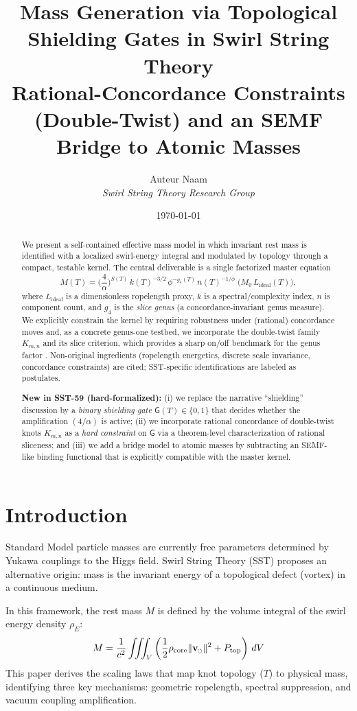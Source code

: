 \documentclass[11pt, a4paper]{article}
\title{\textbf{Mass Generation via Topological Shielding Gates in Swirl String Theory}\\
\large Rational-Concordance Constraints (Double-Twist) and an SEMF Bridge to Atomic Masses}
\author{Auteur Naam \\ \textit{Swirl String Theory Research Group}}
\date{\today}
\newcommand{\swirlarrow}{%
  \mathchoice{\mkern-2mu\scriptstyle\boldsymbol{\circlearrowleft}}%
             {\mkern-2mu\scriptstyle\boldsymbol{\circlearrowleft}}%
             {\mkern-2mu\scriptscriptstyle\boldsymbol{\circlearrowleft}}%
             {\mkern-2mu\scriptscriptstyle\boldsymbol{\circlearrowleft}}%
}
\newcommand{\vswirl}{\mathbf{v}_{\swirlarrow}}
\newcommand{\vnorm}{\lVert \vswirl \rVert}
\begin{document}
\maketitle

\begin{abstract}
We present a self-contained effective mass model in which invariant rest mass is identified with a localized swirl-energy integral and modulated by topology through a compact, testable kernel. The central deliverable is a single factorized master equation
\[
M(T)=\Big(\frac{4}{\alpha}\Big)^{S(T)}\,k(T)^{-3/2}\,\phi^{-g_4(T)}\,n(T)^{-1/\phi}\;\Big(M_0\,L_{\mathrm{ideal}}(T)\Big),
\]
where \(L_{\mathrm{ideal}}\) is a dimensionless ropelength proxy, \(k\) is a spectral/complexity index, \(n\) is component count, and \(g_4\) is the \emph{slice genus} (a concordance-invariant genus measure). We explicitly constrain the kernel by requiring robustness under (rational) concordance moves and, as a concrete genus-one testbed, we incorporate the double-twist family \(K_{m,n}\) and its slice criterion, which provides a sharp on/off benchmark for the genus factor \cite{Lee2025DoubleTwist}. Non-original ingredients (ropelength energetics, discrete scale invariance, concordance constraints) are cited; SST-specific identifications are labeled as postulates.
\par\smallskip
\textbf{New in SST-59 (hard-formalized):} (i) we replace the narrative ``shielding'' discussion by a \emph{binary shielding gate}
\(\mathsf{G}(T)\in\{0,1\}\) that decides whether the amplification \((4/\alpha)\) is active; (ii) we incorporate rational concordance of
double-twist knots \(K_{m,n}\) as a \emph{hard constraint} on \(\mathsf{G}\) via a theorem-level characterization of rational sliceness; and
(iii) we add a bridge model to atomic masses by subtracting an SEMF-like binding functional that is explicitly compatible with the master kernel.
\end{abstract}

\section{Introduction}
Standard Model particle masses are currently free parameters determined by Yukawa couplings to the Higgs field. Swirl String Theory (SST) proposes an alternative origin: mass is the invariant energy of a topological defect (vortex) in a continuous medium.

In this framework, the rest mass $M$ is defined by the volume integral of the swirl energy density $\rho_E$:
\begin{equation}
    M = \frac{1}{c^2} \iiint_V \left( \frac{1}{2}\rho_{\text{core}} \vnorm^2 + P_{\text{top}} \right)\, dV
\end{equation}
This paper derives the scaling laws that map knot topology ($T$) to physical mass, identifying three key mechanisms: geometric ropelength, spectral suppression, and vacuum coupling amplification.
\end{document}
